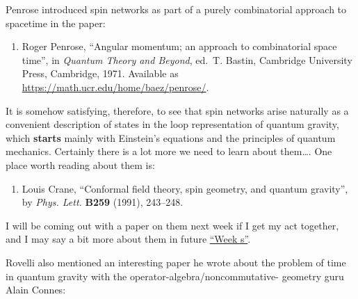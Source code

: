 \documentclass{article}
\def\tightlist{}
\begin{document}
Penrose introduced spin networks as part of a purely combinatorial
approach to spacetime in the paper:

\begin{enumerate}
\def\labelenumi{\arabic{enumi})}
\setcounter{enumi}{1}
\tightlist
\item
  Roger Penrose, ``Angular momentum; an approach to combinatorial space time'', 
   in \emph{Quantum Theory and Beyond}, ed.~T. Bastin,
  Cambridge University Press, Cambridge, 1971.  Available as 
  \href{https://math.ucr.edu/home/baez/penrose/}{https://math.ucr.edu/home/baez/penrose/}.
\end{enumerate}
\noindent
It is somehow satisfying, therefore, to see that spin networks arise
naturally as a convenient description of states in the loop
representation of quantum gravity, which \textbf{starts} mainly with
Einstein's equations and the principles of quantum mechanics. Certainly
there is a lot more we need to learn about them\ldots. One place worth
reading about them is:

\begin{enumerate}
\def\labelenumi{\arabic{enumi})}
\setcounter{enumi}{2}
\tightlist
\item
 Louis Crane,  ``Conformal field theory, spin geometry, and quantum gravity'', by
  \emph{Phys. Lett.} \textbf{B259} (1991), 243--248.
\end{enumerate}
\noindent
I will be coming out with a paper on them next week if I get my act
together, and I may say a bit more about them in future
\protect\hyperlink{weeks}{``Week s''}.

Rovelli also mentioned an interesting paper he wrote about the problem
of time in quantum gravity with the operator-algebra/noncommutative-
geometry guru Alain Connes:
\end{document}
